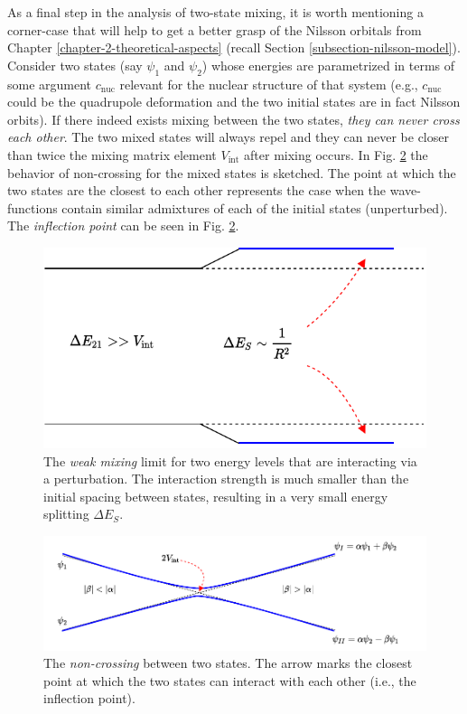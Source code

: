 As a final step in the analysis of two-state mixing, it is worth mentioning a corner-case that will help to get a better grasp of the Nilsson orbitals from Chapter \ref{chapter-2-theoretical-aspects} (recall Section \ref{subsection-nilsson-model}). Consider two states (say $\psi_1$ and $\psi_2$) whose energies are parametrized in terms of some argument $c_\text{nuc}$ relevant for the nuclear structure of that system (e.g., $c_\text{nuc}$ could be the quadrupole deformation and the two initial states are in fact Nilsson orbits). If there indeed exists mixing between the two states, \emph{they can never cross each other}. The two mixed states will always repel and they can never be closer than twice the mixing matrix element $V_\text{int}$ after mixing occurs. In Fig. \ref{fig-non-crossing} the behavior of non-crossing for the mixed states is sketched. The point at which the two states are the closest to each other represents the case when the wave-functions contain similar admixtures of each of the initial states (unperturbed). The \emph{inflection point} can be seen in Fig. \ref{fig-non-crossing}.
\begin{figure}
    \centering
    \includegraphics[scale=0.95]{Chapters/Figures/mixing_weak_coupling.pdf}
    \caption{The \emph{weak mixing} limit for two energy levels that are interacting via a perturbation. The interaction strength is much smaller than the initial spacing between states, resulting in a very small energy splitting $\Delta E_{S}$.}
    \label{weak-mixing-fig}
\end{figure}
\begin{figure}
    \centering
    \includegraphics[scale=0.9]{Chapters/Figures/state_non_crossing.pdf}
    \caption{The \emph{non-crossing} between two states. The arrow marks the closest point at which the two states can interact with each other (i.e., the inflection point).}
    \label{fig-non-crossing}
\end{figure}
